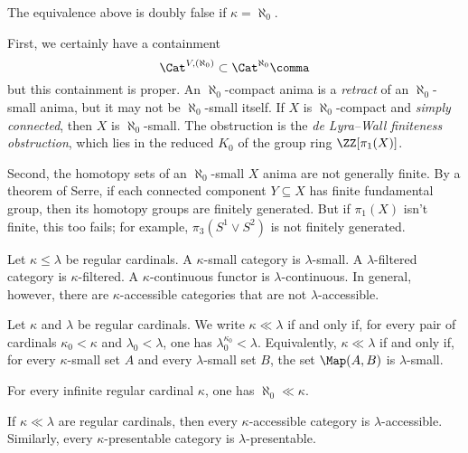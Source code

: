 \begin{eg}
	The equivalence above is doubly false if $ \kappa = \aleph_0 $.

	First, we certainly have a containment
	\[
		\Cat^{V,(\aleph_0)} \subset \Cat^{\aleph_0} \comma
	\]
	but this containment is proper.
	An $ \aleph_0 $-compact anima is a \emph{retract} of
	an $ \aleph_0 $-small anima, but 
	it may not be $ \aleph_0 $-small itself.
	If $ X $ is $ \aleph_0 $-compact and \emph{simply connected},
	then $ X $ is $ \aleph_0 $-small.
	The obstruction is the \emph{de Lyra--Wall finiteness obstruction},
	which lies in the reduced $ K_0 $ of the group ring $ \ZZ[\pi_1(X)] $.

	Second, the homotopy sets of an $ \aleph_0 $-small $ X $ anima
	are not generally finite.
	By a theorem of Serre,
	if each connected component $ Y \subseteq X $
	has finite fundamental group, then
	its homotopy groups are finitely generated.
	But if $ \pi_1(X) $ isn't finite,
	this too fails;
	for example, $ \pi_3(S^1 \vee S^2) $ is not finitely generated.
\end{eg}

\begin{nul}
	Let $ \kappa \leq \lambda $ be regular cardinals.
	A $ \kappa $-small category is $ \lambda $-small.
	A $ \lambda $-filtered category is $ \kappa $-filtered.
	A $ \kappa $-continuous functor is $ \lambda $-continuous.
	In general, however, there are $ \kappa $-accessible categories
	that are not $ \lambda $-accessible.
\end{nul}

\begin{definition}
	Let $ \kappa $ and $ \lambda $ be regular cardinals.
	We write $ \kappa \ll \lambda $
	if and only if,
	for every pair of cardinals
	$ \kappa_0 < \kappa $ and $ \lambda_0 < \lambda $,
	one has $ \lambda_0^{\kappa_0} < \lambda $.
	Equivalently, $ \kappa \ll \lambda $ if and only if,
	for every $ \kappa $-small set $A$
	and every $ \lambda $-small set $ B $,
	the set $ \Map(A, B) $ is $ \lambda $-small.
\end{definition}

\begin{eg}
	For every infinite regular cardinal $ \kappa $,
	one has $ \aleph_0 \ll \kappa $.
\end{eg}

\begin{nul}
	If $ \kappa \ll \lambda $ are regular cardinals,
	then every $ \kappa $-accessible category
	is $ \lambda $-accessible.
	Similarly, every $ \kappa $-presentable category
	is $ \lambda $-presentable.
\end{nul}

